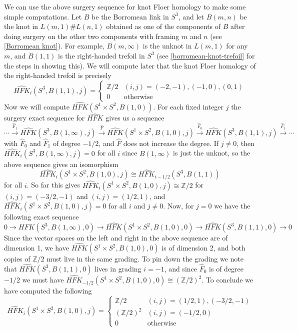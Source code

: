 \begin{example}
We can use the above surgery sequence for knot Floer homology to make some simple computations. Let $B$ be the Borromean link in $S^3$, and let $B(m,n)$ be the knot in $L(m,1) \# L(n,1)$ obtained as one of the components of $B$ after doing surgery on the other two components with framing $m$ and $n$ (see \cref{Borromean knot}). For example, $B(m,\infty)$ is the unknot in $L(m,1)$ for any $m$, and $B(1,1)$ is the right-handed trefoil in $S^3$ (see \cref{borromean-knot-trefoil} for the steps in showing this). We will compute later that the knot Floer homology of the right-handed trefoil is precisely
\[ \widehat{HFK}_i(S^3,B(1,1),j) = \begin{cases} \mathbb Z/2 & (i,j)=(-2,-1),(-1,0),(0,1) \\ 0 & \text{otherwise} \end{cases} \]
Now we will compute $\widehat{HFK}(S^1 \times S^2,B(1,0))$. For each fixed integer $j$ the surgery exact sequence for $\widehat{HFK}$ gives us a sequence
\[ \cdots \stackrel{\widehat F_1}{\longrightarrow} \widehat{HFK}(S^3,B(1,\infty),j) \stackrel{\widehat F}{\longrightarrow} \widehat{HFK}(S^1 \times S^2,B(1,0),j) \stackrel{\widehat F_0}{\longrightarrow} \widehat{HFK}(S^3,B(1,1),j) \stackrel{\widehat F_1}{\longrightarrow} \cdots \]
with $\widehat F_0$ and $\widehat F_1$ of degree $-1/2$, and $\widehat F$ does not increase the degree. If $j \neq 0$, then $\widehat{HFK}_i(S^3,B(1,\infty),j)=0$ for all $i$ since $B(1,\infty)$ is just the unknot, so the above sequence gives an isomorphism
\[ \widehat{HFK}_i(S^1 \times S^2,B(1,0),j) \cong \widehat{HFK}_{i-1/2}(S^3,B(1,1)) \]
for all $i$. So far this gives $\widehat{HFK}_i(S^1 \times S^2,B(1,0),j) \cong \mathbb Z/2$ for $(i,j)=(-3/2,-1)$ and $(i,j)=(1/2,1)$, and $\widehat{HFK}_i(S^1 \times S^2,B(1,0),j)=0$ for all $i$ and $j \neq 0$. Now, for $j=0$ we have the following exact sequence
\[ 0 \longrightarrow \widehat{HFK}(S^3,B(1,\infty),0) \longrightarrow \widehat{HFK}(S^1\times S^2,B(1,0),0) \longrightarrow \widehat{HFK}(S^3,B(1,1),0) \longrightarrow 0 \]
Since the vector spaces on the left and right in the above sequence are of dimension 1, we have $\widehat{HFK}(S^1 \times S^2,B(1,0),0)$ is of dimension 2, and both copies of $\mathbb Z/2$ must live in the same grading. To pin down the grading we note that $\widehat{HFK}(S^3,B(1,1),0)$ lives in grading $i=-1$, and since $\widehat F_0$ is of degree $-1/2$ we must have $\widehat{HFK}_{-1/2}(S^1 \times S^2, B(1,0),0) \cong (\mathbb Z/2)^2$. To conclude we have computed the following
\[ \widehat{HFK}_i(S^1 \times S^2,B(1,0),j) = \begin{cases} \mathbb Z/2 & (i,j)=(1/2,1),(-3/2,-1) \\ (\mathbb Z/2)^2 & (i,j)=(-1/2,0) \\ 0 & \text{otherwise} \end{cases} \]


\end{example}
